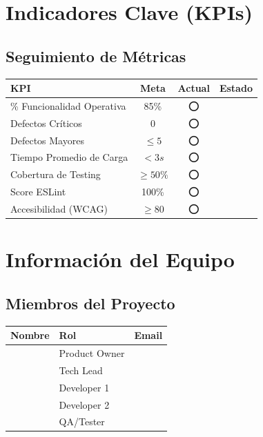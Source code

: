 \documentclass[12pt,a4paper]{report}
\begin{document}
\chapter{Indicadores Clave (KPIs)}

\section{Seguimiento de Métricas}

\begin{table}[h]
    \centering
    \begin{tabular}{|l|c|c|c|}
        \hline
        \rowcolor{grisClaro}
        \textbf{KPI} & \textbf{Meta} & \textbf{Actual} & \textbf{Estado} \\
        \hline
        \% Funcionalidad Operativa & 85\% & ⭕ & \\
        \hline
        Defectos Críticos & 0 & ⭕ & \\
        \hline
        Defectos Mayores & $\leq 5$ & ⭕ & \\
        \hline
        Tiempo Promedio de Carga & $< 3s$ & ⭕ & \\
        \hline
        Cobertura de Testing & $\geq 50\%$ & ⭕ & \\
        \hline
        Score ESLint & 100\% & ⭕ & \\
        \hline
        Accesibilidad (WCAG) & $\geq 80$ & ⭕ & \\
        \hline
    \end{tabular}
\end{table}

\chapter{Información del Equipo}

\section{Miembros del Proyecto}

\begin{table}[h]
    \centering
    \begin{tabular}{|l|l|l|}
        \hline
        \rowcolor{grisClaro}
        \textbf{Nombre} & \textbf{Rol} & \textbf{Email} \\
        \hline
        & Product Owner & \\
        \hline
        & Tech Lead & \\
        \hline
        & Developer 1 & \\
        \hline
        & Developer 2 & \\
        \hline
        & QA/Tester & \\
        \hline
    \end{tabular}
\end{table}
\end{document}

